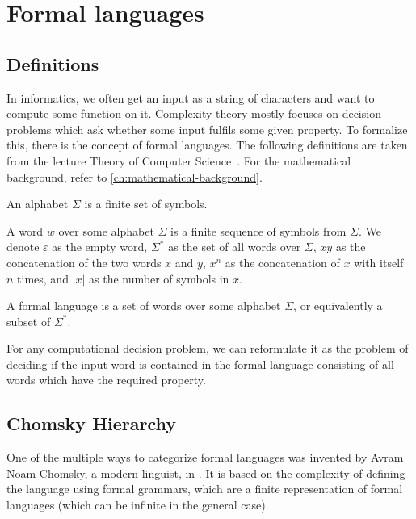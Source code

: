\chapter{Formal languages}\label{ch:formal-languages}


\section{Definitions}\label{sec:definition}

In informatics, we often get an input as a string of characters and want to compute some function on it.
Complexity theory mostly focuses on decision problems which ask whether some input fulfils some given property.
To formalize this, there is the concept of formal languages.
The following definitions are taken from the lecture Theory of Computer Science~\cite{theory-cs}.
For the mathematical background, refer to \cref{ch:mathematical-background}.

\begin{define}[Alphabet]
    An alphabet $\Sigma$ is a finite set of symbols.
\end{define}

\begin{define}[Word]
    A word $w$ over some alphabet $\Sigma$ is a finite sequence of symbols from $\Sigma$.
    We denote $\varepsilon$ as the empty word, $\Sigma^*$ as the set of all words over $\Sigma$, $xy$ as the concatenation of the two words $x$ and $y$, $x^{n}$ as the concatenation of $x$ with itself $n$ times, and $|x|$ as the number of symbols in $x$.
\end{define}

\begin{define}
    A formal language is a set of words over some alphabet $\Sigma$, or equivalently a subset of $\Sigma^*$.
\end{define}

For any computational decision problem, we can reformulate it as the problem of deciding if the input word is contained in the formal language consisting of all words which have the required property.


\section{Chomsky Hierarchy}\label{sec:chromsky-hierarchy}

One of the multiple ways to categorize formal languages was invented by Avram Noam Chomsky, a modern linguist, in \cite{Chomsky1959}.
It is based on the complexity of defining the language using formal grammars, which are a finite representation of formal languages (which can be infinite in the general case).

